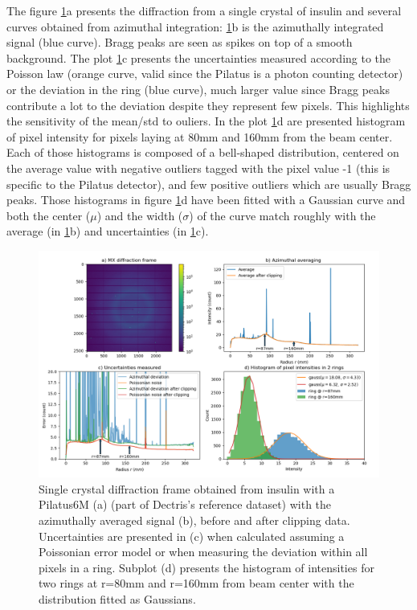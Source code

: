 \documentclass[a4paper,12pt,oneside]{article}              %
\begin{document}
The figure \ref{fig1}a presents the diffraction from a single crystal of insulin and several curves obtained from azimuthal integration: 
\ref{fig1}b is the azimuthally integrated signal (blue curve). Bragg peaks are seen as spikes on top of a smooth background.
The plot \ref{fig1}c presents the uncertainties measured according to the Poisson law (orange curve, valid since the Pilatus is a photon counting detector) 
or the deviation in the ring (blue curve), much larger value since Bragg peaks contribute a lot to the deviation despite they represent few pixels.
This highlights the sensitivity of the mean/std to ouliers.
In the plot \ref{fig1}d are presented histogram of pixel intensity for pixels laying at 80mm and 160mm from the beam center. 
Each of those histograms is composed of a bell-shaped distribution, centered on the average value with negative outliers tagged with the pixel value -1 (this is specific to the Pilatus detector), and few positive outliers which are usually Bragg peaks.   
Those histograms in figure \ref{fig1}d have been fitted with a Gaussian curve and both the center ($\mu$) and the width ($\sigma$) of the curve match 
roughly with the average (in \ref{fig1}b) and uncertainties (in \ref{fig1}c).  
\begin{figure}
\label{fig1}
\begin{center}
\includegraphics[width=14cm]{fig1}
\caption{Single crystal diffraction frame obtained from insulin with a Pilatus6M (a) (part of Dectris's reference dataset) with the azimuthally averaged signal (b), 
before and after clipping data. Uncertainties are presented in (c) when calculated assuming a Poissonian error model or when measuring the deviation within all pixels in a ring.
Subplot (d) presents the histogram of intensities for two rings at r=80mm and r=160mm from beam center with the distribution fitted as Gaussians.}
\end{center}
\end{figure}
\end{document}
